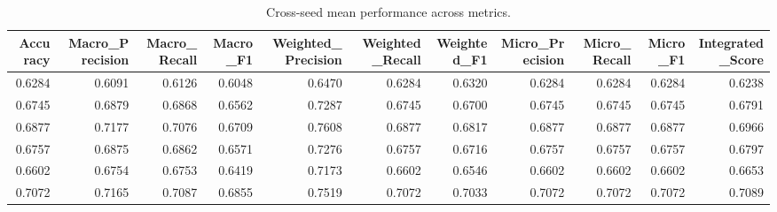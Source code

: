 \begin{table}[t]
\centering
\begin{tabular}{rrrrrrrrrrr}
\toprule
Accuracy & Macro_Precision & Macro_Recall & Macro_F1 & Weighted_Precision & Weighted_Recall & Weighted_F1 & Micro_Precision & Micro_Recall & Micro_F1 & Integrated_Score \\
\midrule
0.6284 & 0.6091 & 0.6126 & 0.6048 & 0.6470 & 0.6284 & 0.6320 & 0.6284 & 0.6284 & 0.6284 & 0.6238 \\
0.6745 & 0.6879 & 0.6868 & 0.6562 & 0.7287 & 0.6745 & 0.6700 & 0.6745 & 0.6745 & 0.6745 & 0.6791 \\
0.6877 & 0.7177 & 0.7076 & 0.6709 & 0.7608 & 0.6877 & 0.6817 & 0.6877 & 0.6877 & 0.6877 & 0.6966 \\
0.6757 & 0.6875 & 0.6862 & 0.6571 & 0.7276 & 0.6757 & 0.6716 & 0.6757 & 0.6757 & 0.6757 & 0.6797 \\
0.6602 & 0.6754 & 0.6753 & 0.6419 & 0.7173 & 0.6602 & 0.6546 & 0.6602 & 0.6602 & 0.6602 & 0.6653 \\
0.7072 & 0.7165 & 0.7087 & 0.6855 & 0.7519 & 0.7072 & 0.7033 & 0.7072 & 0.7072 & 0.7072 & 0.7089 \\
\bottomrule
\end{tabular}
\caption{Cross-seed mean performance across metrics.}
\label{tab:cross_seed_mean}
\end{table}